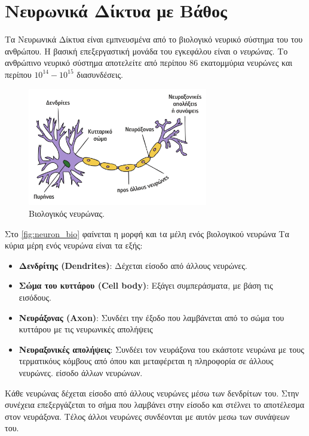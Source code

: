 \section{Νευρωνικά Δίκτυα με Βάθος}
\label{sec:theory_dnn}

Τα Νευρωνικά Δίκτυα είναι εμπνευσμένα από το βιολογικό νευρικό σύστημα του
του ανθρώπου. Η βασική επεξεργαστική μονάδα του εγκεφάλου είναι ο \emph{νευρώνας}.
Το ανθρώπινο νευρικό σύστημα αποτελείτε από περίπου 86 εκατομμύρια νευρώνες και περίπου
$10^14 - 10^15$ διασυνδέσεις.
\begin{figure}[!ht]
  \centering
  \includegraphics[width=0.7\textwidth]{./images/chapter3/neuron.png}
  \caption[Βιολογικός Νευρώνας]{Βιολογικός νευρώνας.}
  \label{fig:neuron_bio}
\end{figure}
Στο \autoref{fig:neuron_bio} φαίνεται η μορφή και tα μέλη ενός βιολογικού νευρώνα
Τα κύρια μέρη ενός νευρώνα είναι τα εξής:
\begin{itemize}
  \item{\textbf{Δενδρίτης (Dendrites)}: Δέχεται είσοδο από άλλους νευρώνες.}
  \item{\textbf{Σώμα του κυττάρου (Cell body)}: Εξάγει συμπεράσματα, με βάση τις εισόδους.}
  \item{\textbf{Νευράξονας (Axon)}: Συνδέει την έξοδο που λαμβάνεται από το σώμα του κυττάρου με τις νευρωνικές απολήψεις}
  \item{\textbf{Νευραξονικές απολήψεις}: Συνδέει τον νευράξονα του εκάστοτε νευρώνα με τους τερματικόυς κόμβους
    από όπου και μεταφέρεται η πληροφορία σε άλλους νευρώνες.
    είσοδο άλλων νευρώνων.}
\end{itemize}
Κάθε νευρώνας δέχεται είσοδο από άλλους νευρώνες μέσω των δενδρίτων του.
Στην συνέχεια επεξεργάζεται το σήμα που λαμβάνει στην είσοδο και
στέλνει το αποτέλεσμα στον νευράξονα. Τέλος άλλοι νευρώνες συνδέονται με αυτόν
μεσω των συνάψεων του.

